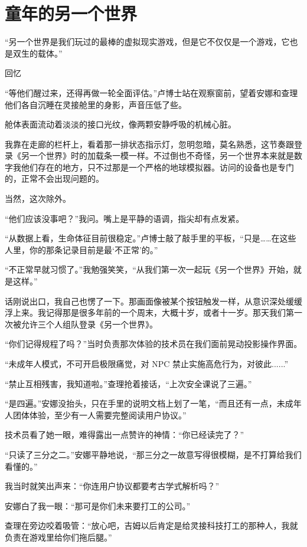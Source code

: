 \chapter{童年的另一个世界}

“另一个世界是我们玩过的最棒的虚拟现实游戏，但是它不仅仅是一个游戏，它也是双生的载体。”

回忆

“等他们醒过来，还得再做一轮全面评估。”卢博士站在观察窗前，望着安娜和查理他们各自沉睡在灵接舱里的身影，声音压低了些。

舱体表面流动着淡淡的接口光纹，像两颗安静呼吸的机械心脏。

我靠在走廊的栏杆上，看着那一排状态指示灯，忽明忽暗，莫名熟悉，这节奏跟登录《另一个世界》时的加载条一模一样。不过倒也不奇怪，另一个世界本来就是数字我他们存在的地方，只不过那是一个严格的地球模拟器。访问的设备也是专门的，正常不会出现问题的。

当然，这次除外。

“他们应该没事吧？”我问。嘴上是平静的语调，指尖却有点发紧。

“从数据上看，生命体征目前很稳定。”卢博士敲了敲手里的平板，“只是……在这些人里，你的那条记录目前是最‘不正常’的。”

“不正常早就习惯了。”我勉强笑笑，“从我们第一次一起玩《另一个世界》开始，就是这样。”

话刚说出口，我自己也愣了一下。那画面像被某个按钮触发一样，从意识深处缓缓浮上来。我记得那是很多年前的一个周末，大概十岁，或者十一岁。那天我们第一次被允许三个人组队登录《另一个世界》。

“你们记得规程了吗？”当时负责那次体验的技术员在我们面前晃动投影操作界面。

“未成年人模式，不可开启极限痛觉，对 NPC 禁止实施高危行为，对彼此......”

“禁止互相残害，我知道啦。”查理抢着接话，“上次安全课说了三遍。”

“是四遍。”安娜没抬头，只在手里的说明文档上划了一笔，“而且还有一点，未成年人团体体验，至少有一人需要完整阅读用户协议。”

技术员看了她一眼，难得露出一点赞许的神情：“你已经读完了？”

“只读了三分之二。”安娜平静地说，“那三分之一故意写得很模糊，是不打算给我们看懂的。”

我当时就笑出声来：“你连用户协议都要考古学式解析吗？”

安娜白了我一眼：“那可是你们未来要打工的公司。”

查理在旁边咬着吸管：“放心吧，吉姆以后肯定是给灵接科技打工的那种人，我就负责在游戏里给你们拖后腿。”

